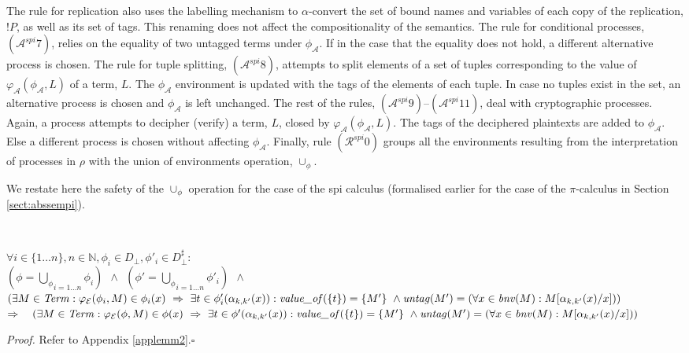 \documentclass[10pt,a4paper,final,oneside,fleqn]{book}
\begin{document}
The rule for replication also uses the labelling mechanism to $\alpha$-convert the set of bound names and variables of each copy of the replication, $!P$, as well as its set of tags.  This renaming does not affect the compositionality of the semantics.  The rule for conditional processes, $(\mathcal{A}^{spi}7)$, relies on the equality of two untagged terms under $\phi_\mathcal{A}$. If in the case that the equality does not hold, a different alternative process is chosen.  The rule for tuple splitting, $(\mathcal{A}^{spi}8)$, attempts to split elements of a set of tuples corresponding to the value of $\varphi_\mathcal{A}(\phi_\mathcal{A},L)$ of a term, $L$.  The $\phi_\mathcal{A}$ environment is updated with the tags of the elements of each tuple. In case no tuples exist in the set, an alternative process is chosen and $\phi_\mathcal{A}$ is left unchanged.  The rest of the rules, $(\mathcal{A}^{spi}9)$--$(\mathcal{A}^{spi}11)$, deal with cryptographic processes.  Again, a process attempts to decipher (verify) a term, $L$, closed by $\varphi_\mathcal{A}(\phi_\mathcal{A},L)$. The tags of the deciphered plaintexts are added to $\phi_\mathcal{A}$.  Else a different process is chosen without affecting $\phi_\mathcal{A}$. Finally, rule $(\mathcal{R}^{spi}0)$ groups all the environments resulting from the interpretation of processes in $\rho$ with the union of environments operation, $\cup_\phi$.

We restate here the safety of the $\cup_\phi$ operation for the case of the spi calculus (formalised earlier for the case of the $\pi$-calculus in Section \ref{sect:abssempi}).
\begin{lema}\label{lemm2}
$ $

\noindent
$\forall i\in \{1\ldots n\},n\in\mathbb{N},\phi_i\in D_\bot,\phi'_i\in D^\sharp_\bot:$\\
$(\phi=\underset{i=1\ldots n}{\bigcup_\phi}\phi_i)~~\wedge~~(\phi'=\underset{i=1\ldots n}{\bigcup_\phi}\phi'_i)~~\wedge$\\
$(\exists M\in\mbox{{\itshape Term\/}}:\varphi_\mathcal{E}(\phi_i,M)\in\phi_i(x)~\Rightarrow~\exists t\in\phi'_i(\alpha_{k,k'}(x)):\mbox{{\itshape value\_of\/}}(\{t\})=\{M'\}~\wedge\hfill\mbox{{\itshape untag\/}}(M')=(\forall x\in\mbox{{\itshape bnv\/}}(M):M[\alpha_{k,k'}(x)/x]))$\\
\noindent
$\Rightarrow~~~(\exists M\in\mbox{{\itshape Term\/}}:\varphi_\mathcal{E}(\phi,M)\in\phi(x)~\Rightarrow~\exists t\in\phi'(\alpha_{k,k'}(x)): \mbox{{\itshape value\_of\/}}(\{t\})=\{M'\}~\wedge\hfill\mbox{{\itshape untag\/}}(M')=(\forall x\in\mbox{{\itshape bnv\/}}(M):M[\alpha_{k,k'}(x)/x]))$
\end{lema}
\noindent
{\itshape Proof.\/} Refer to Appendix \ref{applemm2}.\hfill$\square$
\end{document}
